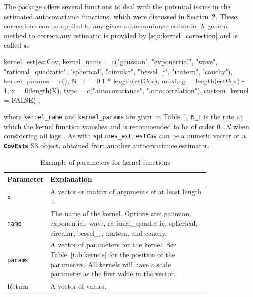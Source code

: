 The package offers several functions to deal with the potential issues in the estimated autocovariance functions, which were discussed in Section~\hyperref[sec:nonparametric]{2}. These corrections can be applied to any given autocovariance estimate.
A general method to correct any estimator is provided by \eqref{eqn:kernel_correction} and is called as 
\begin{example}
kernel_est(estCov, kernel_name = c("gaussian", "exponential", "wave",
        "rational_quadratic", "spherical", "circular", "bessel_j", "matern", "cauchy"),
        kernel_params = c(), N_T = 0.1 * length(estCov), maxLag = length(estCov) - 1,
        x = 0:length(X), type = c("autocovariance", "autocorrelation"),
        custom_kernel = FALSE) ,
\end{example}
where \texttt{kernel\_name} and \texttt{kernel\_params} are given in Table~\ref{tab:kernel}, \texttt{N\_T} is the rate at which the kernel function vanishes and is recommended to be of order \(0.1 N\) when considering all lags \citep[Section~3.17]{Yaglom1987}.
As with \texttt{splines\_est}, \texttt{estCov} can be a numeric vector or a \textbf{\texttt{CovEsts}} S3 object, obtained from another autocovariance estimator.

\begin{table}[!hbp]
    \centering
    \begin{tabular}{l p{0.82\linewidth}}\toprule
        Parameter & Explanation \\ \midrule
        \texttt{x} & A vector or matrix of arguments of at least length 1. \\
        \texttt{name} & The name of the kernel. Options are: gaussian, exponential, wave, rational\_quadratic, spherical, circular, bessel\_j, matern, and cauchy. \\
        \texttt{params} & A vector of parameters for the kernel. See Table~\ref{tab:kernels} for the position of the parameters. All kernels will have a scale parameter as the first value in the vector. \\ \midrule
        Return & A vector of values. \\ \toprule
    \end{tabular}
    \caption{Example of parameters for kernel functions}
    \label{tab:kernel}
\end{table}

